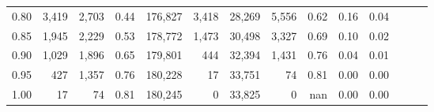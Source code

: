 \begin{tabular}{rrrrrrrrrrrrrr}
0.80 &   3,419 &  2,703 &  0.44 &  176,827 &    3,418 &  28,269 &   5,556 &  0.62 &  0.16 &      0.04 \\
0.85 &   1,945 &  2,229 &  0.53 &  178,772 &    1,473 &  30,498 &   3,327 &  0.69 &  0.10 &      0.02 \\
0.90 &   1,029 &  1,896 &  0.65 &  179,801 &      444 &  32,394 &   1,431 &  0.76 &  0.04 &      0.01 \\
0.95 &     427 &  1,357 &  0.76 &  180,228 &       17 &  33,751 &      74 &  0.81 &  0.00 &      0.00 \\
1.00 &      17 &     74 &  0.81 &  180,245 &        0 &  33,825 &       0 &   nan &  0.00 &      0.00 \\
\bottomrule
\end{tabular}
